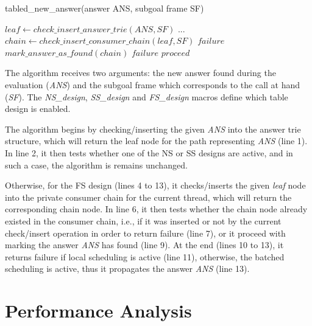 \documentclass{llncs}
\begin{document}
\begin{algorithm} [ht]
\caption{tabled\_new\_answer(answer ANS, subgoal frame SF)}
\begin{algorithmic}[1]
  \STATE $leaf \gets check\_insert\_answer\_trie(ANS, SF)$
    \STATE $. . .$                         
  \ELSE                                                  [FS design]
    \STATE $chain \gets check\_insert\_consumer\_chain(leaf, SF)$
      \RETURN $failure$
       \STATE $mark\_answer\_as\_found(chain)$
         \RETURN $failure$
         \RETURN $proceed$
       \ENDIF
     \ENDIF
   \ENDIF
\end{algorithmic}
\label{alg_table_new_answer_batched}
\end{algorithm}

The algorithm receives two arguments: the new answer found during the
evaluation (\emph{ANS}) and the subgoal frame which corresponds to the
call at hand (\emph{SF}). The \emph{NS\_design}, \emph{SS\_design} and
\emph{FS\_design} macros define which table design is enabled.

The algorithm begins by checking/inserting the given \emph{ANS} into
the answer trie structure, which will return the leaf node for the
path representing \emph{ANS} (line 1). In line 2, it then tests
whether one of the NS or SS designs are active, and in such a case,
the algorithm is remains unchanged.

Otherwise, for the FS design (lines 4 to 13), it checks/inserts
the given \emph{leaf} node into the private consumer chain for the
current thread, which will return the corresponding chain node. In
line 6, it then tests whether the chain node already existed in the
consumer chain, i.e., if it was inserted or not by the current
check/insert operation in order to return failure (line 7), or it
proceed with marking the answer \emph{ANS} has found (line 9). At the
end (lines 10 to 13), it returns failure if local scheduling is active
(line 11), otherwise, the batched scheduling is active, thus it
propagates the answer \emph{ANS} (line 13).

\section{Performance Analysis}
\end{document}
